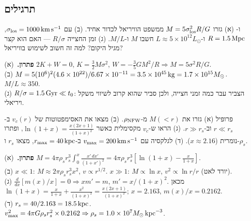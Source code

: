 \subsection*{תרגילים}
\begin{exercise}{ ו-}
(א) גזרו $M=5\sigma_{\rm los}^2R/G$ ממשפט הוויריאל לכדור אחיד. (ב) עם $\sigma_{\rm los}=1000\,\mathrm{km\,s^{-1}}$, $R=1.5\,\mathrm{Mpc}$ ו-$L\approx5\times10^{12}L_\odot$ חשבו $M$ ו-$M/L$. (ג) זמן החצייה $R/\sigma$ --- האם הוא קצר מגיל היקום? למה זה חשוב לשימוש בוויריאל?
\end{exercise}
\begin{solbox}
\textbf{פתרון.}\ (א) $2K+W=0$, $K=\tfrac32M\sigma^2$, $W=-\tfrac35GM^2/R\Rightarrow M=5\sigma^2R/G$.\\
(ב) $M=5(10^6)^2(4.6\times10^{22})/6.67\times10^{-11}=3.5\times10^{45}\,\mathrm{kg}=1.7\times10^{15}M_{\odot}$. $M/L\approx350$.\\
(ג) $R/\sigma=1.5\,\mathrm{Gyr}\ll t_0$: הצביר עבר כמה זמני חצייה, ולכן סביר שהוא קרוב לשיווי משקל ויריאלי.
\end{solbox}

\begin{exercise}{פרופיל }
(א) גזרו את $M(<r)$ מ-$\rho_{\rm NFW}$. (ב) מצאו את האסימפטוטות של $v_c(r)$ ב-$r\ll r_s$ וב-$r\gg r_s$. (ג) הראו ש-$v_c$ מקסימלית כאשר $\ln(1+x)=\frac{x(2x+1)}{(1+x)^2}$, ופתרו נומרית ($x\approx2.16$). (ד) לגלקסיה עם $v_{\max}=200\,\mathrm{km\,s^{-1}}$ ב-$r_{\max}=40\,\mathrm{kpc}$, מצאו $r_s$ ו-$\rho_s$.
\end{exercise}
\begin{solbox}
\textbf{פתרון.}\ (א) $M=4\pi\rho_sr_s^3\int_0^x\frac{x'\,dx'}{(1+x')^2}=4\pi\rho_sr_s^3[\ln(1+x)-\frac{x}{1+x}]$.\\
(ב) $x\ll1$: $M\approx2\pi\rho_sr_s^3x^2$, $v\propto r^{1/2}$. $x\gg1$: $M\propto\ln x$, $v^2\propto\ln r/r$ (יורד לאט).\\
(ג) $\frac{d}{dx}[m(x)/x]=0\Rightarrow xm'=m$, $m'=x/(1+x)^2$. מכאן $\ln(1+x)=\frac{x}{1+x}+\frac{x^2}{(1+x)^2}=\frac{x(2x+1)}{(1+x)^2}$; $x=2.163$, $m(x)/x=0.2162$.\\
(ד) $r_s=40/2.163=18.5\,\mathrm{kpc}$. $v_{\max}^2=4\pi G\rho_sr_s^2\times0.2162\Rightarrow\rho_s=1.0\times10^7M_{\odot}\,\mathrm{kpc}^{-3}$.
\end{solbox}

